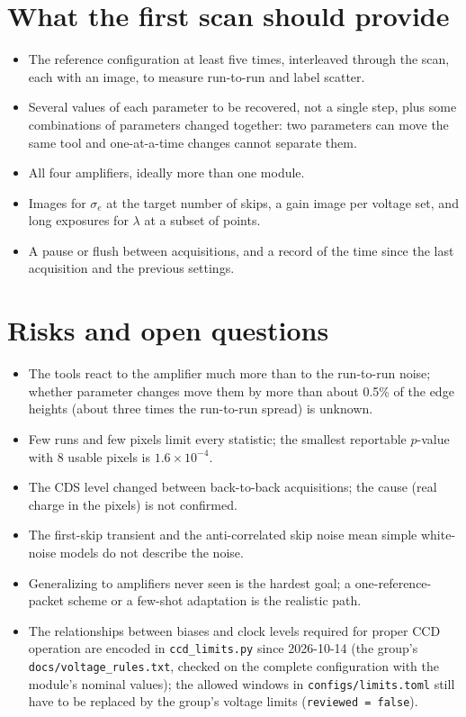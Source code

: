 \documentclass[11pt]{article}
\newcommand{\code}[1]{\texttt{#1}}
\begin{document}
\section{What the first scan should provide}
\begin{itemize}
  \item The reference configuration at least five times, interleaved through the scan, each with an image, to measure run-to-run and
        label scatter.
  \item Several values of each parameter to be recovered, not a single step, plus some combinations of parameters changed together:
        two parameters can move the same tool and one-at-a-time changes cannot separate them.
  \item All four amplifiers, ideally more than one module.
  \item Images for $\sigma_e$ at the target number of skips, a gain image per voltage set, and long exposures for $\lambda$ at a subset of points.
  \item A pause or flush between acquisitions, and a record of the time since the last acquisition and the previous settings.
\end{itemize}

\section{Risks and open questions}
\begin{itemize}
  \item The tools react to the amplifier much more than to the run-to-run noise; whether parameter changes move them by more than about 0.5\%
        of the edge heights (about three times the run-to-run spread) is unknown.
  \item Few runs and few pixels limit every statistic; the smallest reportable $p$-value with 8 usable pixels is $1.6\times10^{-4}$.
  \item The CDS level changed between back-to-back acquisitions; the cause (real charge in the pixels) is not confirmed.
  \item The first-skip transient and the anti-correlated skip noise mean simple white-noise models do not describe the noise.
  \item Generalizing to amplifiers never seen is the hardest goal; a one-reference-packet scheme or a few-shot adaptation is the realistic path.
  \item The relationships between biases and clock levels required for proper CCD operation are encoded in \code{ccd\_limits.py} since
  2026-10-14 (the group's \code{docs/voltage\_rules.txt}, checked on the complete configuration with the module's nominal values);
  the allowed windows in \code{configs/limits.toml} still have to be replaced by the group's voltage limits (\code{reviewed = false}).
\end{itemize}
\end{document}
